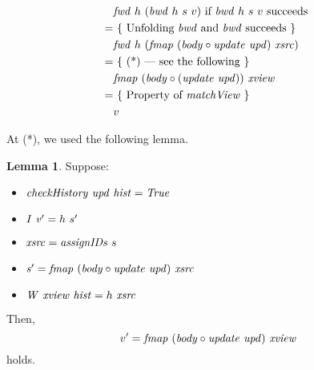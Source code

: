 \documentclass{article}
\theoremstyle{definition}
\newtheorem{lemma}{Lemma}
\begin{document}
\begin{align*}
  & \mathit{fwd}~h~(\mathit{bwd}~h~s~v) \mbox{ if $\mathit{bwd}~h~s~v$ succeeds } \\
= & ~\{ \mbox{ Unfolding $\mathit{bwd}$ and $\mathit{bwd}$ succeeds } \}\\
  & \mathit{fwd}~h~(\mathit{fmap}~(\mathit{body} \circ \mathit{update}~\mathit{upd})~\mathit{xsrc})\\
= & ~\{ \mbox{ (*) --- see the following } \}\\
  & \mathit{fmap}~(\mathit{body} \circ (\mathit{update}~\mathit{upd}))~\mathit{xview}\\
= & ~\{ \mbox{ Property of $\mathit{matchView}$ } \} \\
  & v 
\end{align*}

At (*), we used the following lemma.
\begin{lemma}
Suppose: 
\begin{itemize}
\item  $\mathit{checkHistory}~\mathit{upd}~\mathit{hist} = \mathit{True}$
\item $\mathit{I}~\mathit{v'} = h~s'$
\item  $\mathit{xsrc} = \mathit{assignIDs}~s$ 
\item  $\mathit{s'} = \mathit{fmap}~(\mathit{body} \circ \mathit{update}~\mathit{upd})~\mathit{xsrc}$ 
\item  $\mathit{W}~\mathit{xview}~\mathit{hist} = h~\mathit{xsrc}$ 
\end{itemize}
Then, 
\[
  v' = \mathit{fmap}~(\mathit{body} \circ \mathit{update}~\mathit{upd})~\mathit{xview}
\]
holds.
\end{lemma}
\end{document}
